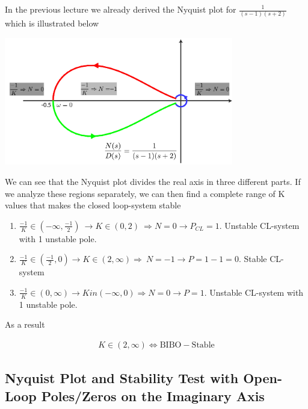 \documentclass[twoside]{article}
\begin{document}
In the previous lecture we already derived the
Nyquist plot for $\frac{1}{(s-1)(s+2) }$ which is illustrated below

\vspace{6 pt}

  \begin{minipage}[h]{1\linewidth}
    \begin{center}
      \includegraphics[width=0.75\textwidth]{ex4}
    \end{center}
  \end{minipage}

\vspace{6 pt}

We can see that the Nyquist plot divides the real axis in
three different parts. If we analyze 
these regions separately, we can then find a complete range of
K values that makes the closed loop-system stable
%
\begin{enumerate}
  \item $\frac{-1}{K} \in (-\infty , \frac{-1}{2} ) \ \rightarrow K
    \in (0 , 2) \  \Rightarrow N = 0 \rightarrow P_{CL} = 1$. 
    Unstable CL-system with 1 unstable pole. 
  \item $\frac{-1}{K} \in \left( \frac{-1}{2} , 0 \right) \rightarrow K \in (2 , \infty)  
    \Rightarrow \ N = -1 \rightarrow P = 1 - 1 = 0$. Stable CL-system
  \item $\frac{-1}{K} \in (0 , \infty) \rightarrow K in (-\infty , 0) \Rightarrow N = 0
   \rightarrow P = 1$. Unstable CL-system with 1 unstable pole.
\end{enumerate}
%
As a result 

\begin{align*}
  K \in (2 , \infty) \Leftrightarrow \mathrm{BIBO-Stable}
\end{align*}

\newpage

\subsection{Nyquist Plot and Stability Test with  Open-Loop Poles/Zeros on the Imaginary Axis}
\end{document}
